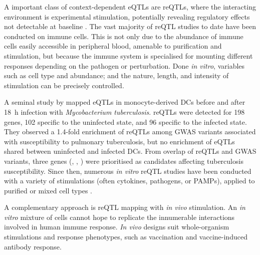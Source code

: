 \begin{outline}
A important class of context-dependent \glspl{eQTL} are \glspl{reQTL}, 
where the interacting environment is experimental stimulation,
potentially revealing regulatory effects not detectable at baseline \autocite{vandiedonck2017GeneticAssociationMolecular,huang2019GeneticsGeneExpression}.
The vast majority of \gls{reQTL} studies to date have been conducted on immune cells. 
This is not only due to the abundance of immune cells easily accessible in peripheral blood, amenable to purification and stimulation,
but because the immune system is specialised for mounting different responses depending on the pathogen or perturbation.
Done \textit{in vitro}, variables such as cell type and abundance; and the nature, length, and intensity of stimulation can be precisely controlled.

A seminal study by \textcite{barreiro2012DecipheringGeneticArchitecture} mapped \glspl{eQTL} in monocyte-derived \glspl{DC} before and after \SI{18}{\hour} infection with \textit{Mycobacterium tuberculosis}.
\glspl{reQTL} were detected for 198 genes, 102 specific to the uninfected state, and 96 specific to the infected state. 
They observed a 1.4-fold enrichment of \glspl{reQTL} among \gls{GWAS} variants associated with susceptibility to pulmonary tuberculosis,
but no enrichment of \glspl{eQTL} shared between uninfected and infected \glspl{DC}.
From overlap of \glspl{reQTL} and \gls{GWAS} variants,
three genes (, , ) were prioritised as candidates affecting tuberculosis susceptibility.
Since then, numerous \textit{in vitro} \gls{reQTL} studies have been conducted with a variety of stimulations (often cytokines, pathogens, or \glspl{PAMP}),
applied to purified \autocite{fairfax2014InnateImmuneActivity,kim2014CharacterizingGeneticBasis,hu2014RegulationGeneExpression,lee2014CommonGeneticVariants,caliskan2015HostGeneticVariation,quach2016GeneticAdaptationNeandertal,kim-hellmuth2017GeneticRegulatoryEffects,alasoo2018SharedGeneticEffects,gate2018GeneticDeterminantsCoaccessible,schmiedel2018ImpactGeneticPolymorphisms,alasoo2019GeneticEffectsPromoter,calderon2019LandscapeStimulationresponsiveChromatin,devries2020IntegratingGWASBulk,huang2020NeonatalGeneticsGene}
or mixed cell types \autocite{caliskan2015HostGeneticVariation,manry2017DecipheringGeneticControl}.

A complementary approach is \gls{reQTL} mapping with \textit{in vivo} stimulation.
An \textit{in vitro} mixture of cells cannot hope to replicate the innumerable interactions involved in human immune response.
\textit{In vivo} designs suit whole-organism stimulations and response phenotypes,
such as vaccination and vaccine-induced antibody response.


\end{outline}
